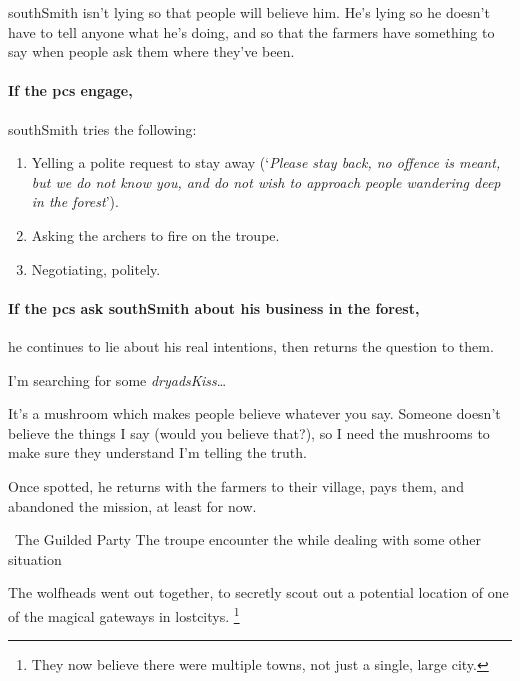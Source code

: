 \Gls{southSmith} isn't lying so that people will believe him.
He's lying so he doesn't have to tell anyone what he's doing, and so that the farmers have something to say when people ask them where they've been.

\paragraph{If the \glspl{pc} engage,}

\Gls{southSmith} tries the following:

\begin{enumerate}
  \item
  Yelling a polite request to stay away (`\textit{Please stay back, no offence is meant, but we do not know you, and do not wish to approach people wandering deep in the forest}').
  \item
  Asking the archers to fire on the troupe.
  \item
  Negotiating, politely.
\end{enumerate}


\label{southSmith}

\paragraph{If the \glspl{pc} ask \gls{southSmith} about his business in the forest,}
he continues to lie about his real intentions, then returns the question to them.

\begin{speechtext}
  I'm searching for some \textit{\gls{dryadsKiss}}\ldots

  It's a mushroom which makes people believe whatever you say.
  Someone doesn't believe the things I say (would you believe that?), so I need the mushrooms to make sure they understand I'm telling the truth.
\end{speechtext}

Once spotted, he returns with the farmers to their \gls{village}, pays them, and abandoned the mission, at least for now.

{\squash~The Guilded Party}%
{The troupe encounter the  while dealing with some other situation}%

\begin{exampletext}
  The \glspl{wolfhead} went out together, to secretly scout out a potential location of one of the magical gateways in \glspl{lostcity}.%
  \footnote{They now believe there were multiple towns, not just a single, large city.}
\end{exampletext}

